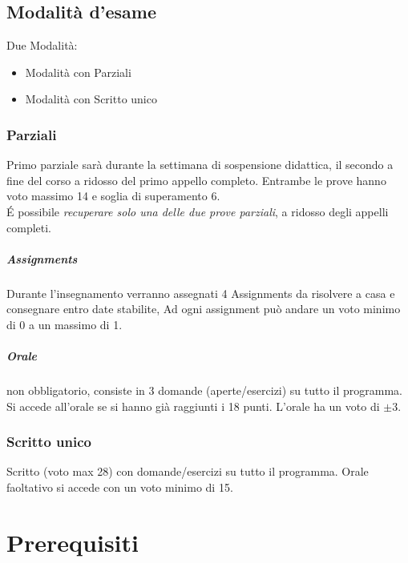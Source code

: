 \documentclass[12pt, a4paper, openany]{book}
\begin{document}
\section{Modalità d'esame}
Due Modalità:
\begin{itemize}
    \item Modalità con Parziali
    \item Modalità con Scritto unico
\end{itemize}

\subsection*{Parziali}
Primo parziale sarà durante la settimana di sospensione didattica, il secondo a fine del corso a ridosso del primo appello completo.
Entrambe le prove hanno voto massimo 14 e soglia di superamento 6.
\\É possibile \emph{recuperare solo una delle due prove parziali}, a ridosso degli appelli completi.
\paragraph*{Assignments} Durante l'insegnamento verranno assegnati 4 Assignments da risolvere a casa e consegnare entro date stabilite,
Ad ogni assignment può andare un voto minimo di 0 a un massimo di 1.
\paragraph*{Orale} non obbligatorio, consiste in 3 domande (aperte/esercizi) su tutto il programma. 
Si accede all'orale se si hanno già raggiunti i 18 punti. L'orale ha un voto di $\pm 3$.

\subsection*{Scritto unico}
Scritto (voto max 28) con domande/esercizi su tutto il programma. 
Orale faoltativo si accede con un voto minimo di 15.



\chapter{Prerequisiti}
\end{document}
